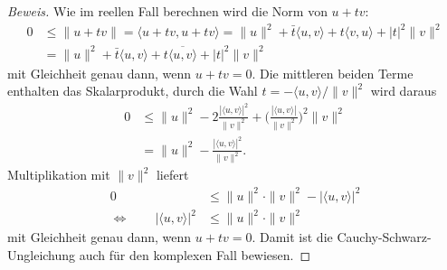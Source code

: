 \begin{proof}[Beweis]
Wie im reellen Fall berechnen wird die Norm von $u+tv$:
\begin{align*}
0&\le
\| u+tv\|=\langle u+tv,u+tv\rangle
=
\|u\|^2 + \bar{t}\langle u,v\rangle + t\langle v,u\rangle + |t|^2 \|v\|^2
\\
&=
\|u\|^2 + \bar{t}\langle u,v\rangle + t\overline{\langle u,v\rangle} + |t|^2 \|v\|^2
\end{align*}
mit Gleichheit genau dann, wenn $u+tv=0$.
Die mittleren beiden Terme enthalten das Skalarprodukt, durch die Wahl
$t=-\langle u,v\rangle/\|v\|^2$ wird daraus
\begin{align*}
0
&\le
\|u\|^2 - 2\frac{|\langle u,v\rangle|^2}{\|v\|^2}
+
\biggl(\frac{|\langle u,v\rangle|}{\|v\|^2}\biggr)^2\|v\|^2
\\
&=
\|u\|^2 - \frac{|\langle u,v\rangle|^2}{\|v\|^2}.
\end{align*}
Multiplikation mit $\|v\|^2$ liefert
\begin{align*}
0&\le \|u\|^2 \cdot \|v\|^2 - |\langle u,v\rangle|^2
\\
\Leftrightarrow
\qquad
|\langle u,v\rangle|^2
&\le \|u\|^2 \cdot \|v\|^2
\end{align*}
mit Gleichheit genau dann, wenn $u+tv=0$.
Damit ist die Cauchy-Schwarz-Ungleichung auch für den komplexen Fall bewiesen.
\end{proof}

